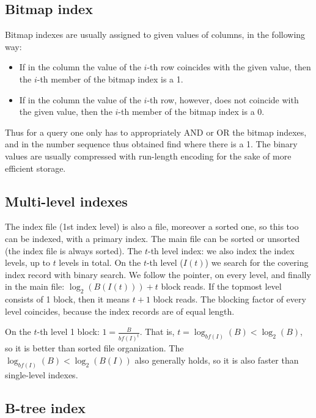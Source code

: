 \documentclass[margin=0px]{article}
\begin{document}
\subsection{Bitmap index}

Bitmap indexes are usually assigned to given values of columns, in the following way:
\begin{itemize}
    \item	If in the column the value of the $i$-th row coincides with the given value, then the $i$-th member of the bitmap index
          is a 1.

    \item	If in the column the value of the $i$-th row, however, does not coincide with the given value, then the $i$-th member of the bitmap
          index is a 0.
\end{itemize}

Thus for a query one only has to appropriately AND or OR the bitmap indexes, and in the
number sequence thus obtained find where there is a 1.
The binary values are usually compressed with run-length encoding for the sake of more efficient storage.

\subsection{Multi-level indexes}

The index file (1st index level) is also a file, moreover a sorted one, so this too can be indexed, with a primary
index. The main file can be sorted or unsorted (the index file is always sorted). The $t$-th level index: we also index the
index levels, up to $t$ levels in total.
On the $t$-th level ($I(t)$) we search for the covering index record with binary search. We follow the pointer, on every
level, and finally in the main file: $\log_{2}(B(I(t))) + t$ block reads. If the topmost level consists of 1 block, then it means $t+1$
block reads. The blocking factor of every level coincides, because the index records are of equal length.

On the $t$-th level 1 block: $1=\frac{B}{bf(I)^{t}}$. That is, $t=\log_{bf(I)}(B) < \log_{2}(B)$, so it is better than sorted file organization. The
$\log_{bf(I)}(B) < \log_{2}(B(I))$ also generally holds, so it is also
faster than single-level indexes.

\subsection{B-tree index}
\end{document}
